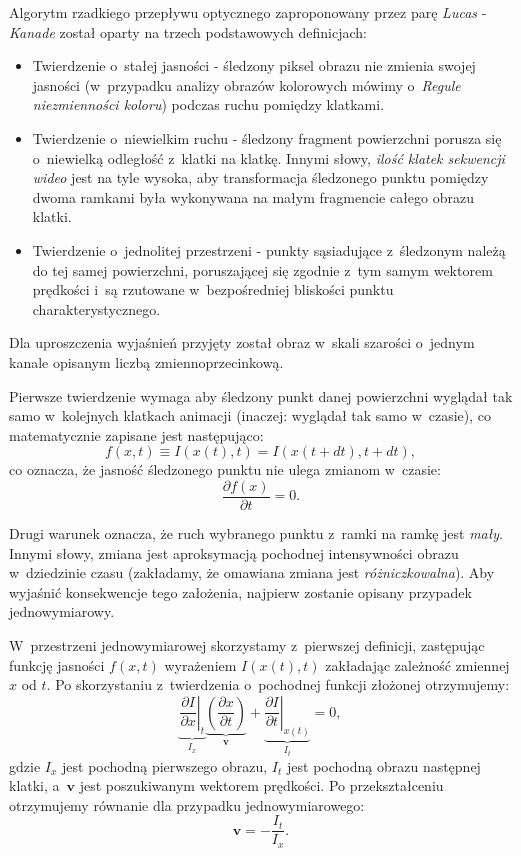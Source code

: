     \newpage
    Algorytm rzadkiego przepływu optycznego zaproponowany przez parę \textit{Lucas} - \textit{Kanade} został oparty na trzech podstawowych definicjach:
    \begin{itemize}
      \item Twierdzenie o~stałej jasności - śledzony piksel obrazu nie zmienia swojej jasności (w~przypadku analizy obrazów kolorowych mówimy o~\textit{Regule niezmienności koloru}) podczas ruchu pomiędzy klatkami.
      \item Twierdzenie o~niewielkim ruchu - śledzony fragment powierzchni porusza się o~niewielką odległość z~klatki na klatkę. Innymi słowy, \textit{ilość klatek sekwencji wideo} jest na tyle wysoka, aby transformacja śledzonego punktu pomiędzy dwoma ramkami była wykonywana na małym fragmencie całego obrazu klatki.
      \item Twierdzenie o~jednolitej przestrzeni - punkty sąsiadujące z~śledzonym należą do tej samej powierzchni, poruszającej się zgodnie z~tym samym wektorem prędkości i~są rzutowane w~bezpośredniej bliskości punktu charakterystycznego.
    \end{itemize}

    Dla uproszczenia wyjaśnień przyjęty został obraz w~skali szarości o~jednym kanale opisanym liczbą zmiennoprzecinkową.

    Pierwsze twierdzenie wymaga aby śledzony punkt danej powierzchni wyglądał tak samo w~kolejnych klatkach animacji (inaczej: wyglądał tak samo w~czasie), co matematycznie zapisane jest następująco: \[ f(x, t) \equiv I(x(t), t) = I(x(t + dt), t + dt), \] co oznacza, że jasność śledzonego punktu nie ulega zmianom w~czasie: \[ \frac{\partial f(x)}{\partial t} = 0. \]

    Drugi warunek oznacza, że ruch wybranego punktu z~ramki na ramkę jest \textit{mały}. Innymi słowy, zmiana jest aproksymacją pochodnej intensywności obrazu w~dziedzinie czasu (zakładamy, że omawiana zmiana jest \textit{różniczkowalna}). Aby wyjaśnić konsekwencje tego założenia, najpierw zostanie opisany przypadek jednowymiarowy.

    W~przestrzeni jednowymiarowej skorzystamy z~pierwszej definicji, zastępując funkcję jasności $f(x,t)$ wyrażeniem $I(x(t), t)$ zakładając zależność zmiennej $x$ od $t$. Po skorzystaniu z~twierdzenia o~pochodnej funkcji złożonej otrzymujemy: \[ \underbrace{ \left. \frac{\partial I}{\partial x}\right|_{t} }_{I_{x}} \underbrace{ \left(\frac{\partial x}{\partial t}\right) }_{\mathbf{v}} + \underbrace{ \left. \frac{\partial I}{\partial t}\right|_{x(t)} }_{I_{t}} = 0, \] gdzie $I_{x}$ jest pochodną pierwszego obrazu, $I_{t}$ jest pochodną obrazu następnej klatki, a~$\mathbf{v}$ jest poszukiwanym wektorem prędkości. Po przekształceniu otrzymujemy równanie dla przypadku jednowymiarowego: \[ \mathbf{v} = -\frac{I_{t}}{I_{x}}. \]

